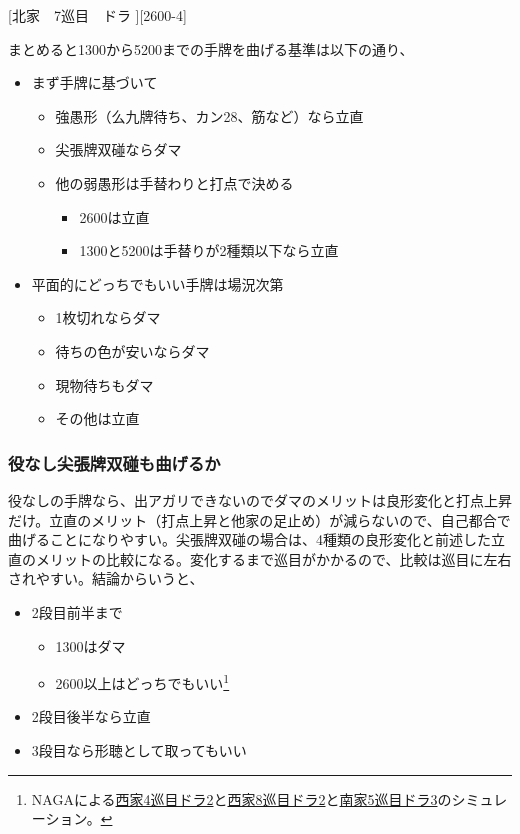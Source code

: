 \documentclass[../nankiru_main.tex]{subfiles}
\begin{document}
[北家　7巡目　ドラ ][2600-4]

まとめると1300から5200までの手牌を曲げる基準は以下の通り、

\begin{itemize}
  \item まず手牌に基づいて
  \begin{itemize}
    \item 強愚形（么九牌待ち、カン28、筋など）なら立直
    \item 尖張牌双碰ならダマ
    \item 他の弱愚形は手替わりと打点で決める
    \begin{itemize}
      \item 2600は立直
      \item 1300と5200は手替りが2種類以下なら立直
    \end{itemize}
  \end{itemize}
  \item 平面的にどっちでもいい手牌は場況次第
  \begin{itemize}
    \item 1枚切れならダマ
    \item 待ちの色が安いならダマ
    \item 現物待ちもダマ
    \item その他は立直
  \end{itemize}
\end{itemize}


\subsubsection*{役なし尖張牌双碰も曲げるか}

役なしの手牌なら、出アガリできないのでダマのメリットは良形変化と打点上昇だけ。立直のメリット（打点上昇と他家の足止め）が減らないので、自己都合で曲げることになりやすい。尖張牌双碰の場合は、4種類の良形変化と前述した立直のメリットの比較になる。変化するまで巡目がかかるので、比較は巡目に左右されやすい。結論からいうと、

\begin{itemize}
  \item 2段目前半まで
  \begin{itemize}
    \item 1300はダマ
    \item 2600以上はどっちでもいい\footnote{NAGAによる\href{https://naga.dmv.nico/htmls/8c2bd4b5841cb6cca44af62408bb00cdfd4165fd26776691a9ee891d767e8d80v2_2.html?tw=2}{西家4巡目ドラ2}と\href{https://naga.dmv.nico/htmls/d44d3e0059c563ff373cf9e4123c46e4fd66bcbb8cde386a935d8d96e6e041c9v2_2.html?tw=2}{西家8巡目ドラ2}と\href{https://naga.dmv.nico/htmls/dfbfd7e6d647892ceb0c9803245896534697d58598d4446fb26bf48b60986b93v2_2.html?tw=1}{南家5巡目ドラ3}のシミュレーション。}
  \end{itemize}
  \item 2段目後半なら立直
  \item 3段目なら形聴として取ってもいい
\end{itemize}
\end{document}

